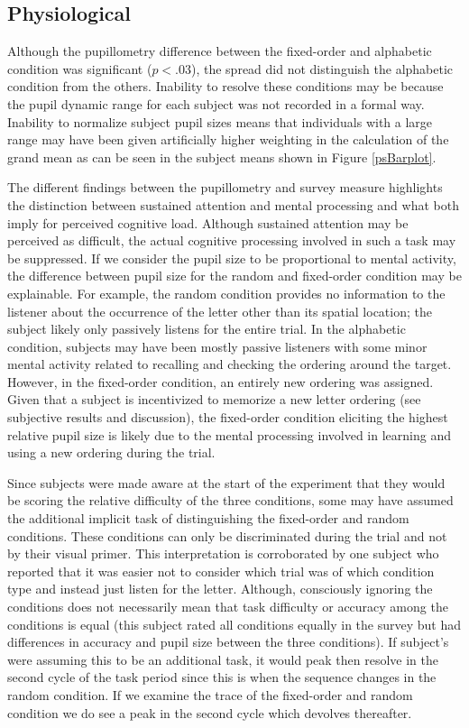 \documentclass[10pt]{article}
\begin{document}
\subsection{Physiological}

Although the pupillometry difference between the fixed-order
and alphabetic condition was significant ($p<.03$), the spread
did not distinguish the alphabetic condition from the others.
Inability to resolve these conditions may be because the pupil
dynamic range for each subject was not recorded in a formal
way. Inability to normalize subject pupil sizes means that
individuals with a large range may have been given
artificially higher weighting in the calculation of the grand
mean as can be seen in the subject means shown in Figure
\ref{psBarplot}.

The different findings between the pupillometry and survey measure
highlights the distinction between sustained attention and
mental processing and what both imply for perceived cognitive
load.  Although sustained attention may be perceived as
difficult, the actual cognitive processing involved in such a
task may be suppressed.
If we consider the pupil size to be proportional to mental
activity, the difference between pupil size for the random and
fixed-order condition may be explainable.  For example, the
random condition provides no information to the listener about
the occurrence of the letter other than its spatial location;
the subject likely only passively listens for the
entire trial.  In the alphabetic condition,
subjects may have been mostly passive listeners with some minor mental activity
related to recalling and checking the ordering around the target.
However, in the fixed-order condition,
an entirely new ordering was assigned. Given that
a subject is incentivized to memorize a new letter ordering
(see subjective results and discussion), the fixed-order
condition eliciting the highest relative pupil size 
is likely due to the mental processing involved
in learning and using a new ordering during the trial.  

Since subjects were made aware at the start of the experiment
that they would be scoring the relative difficulty of the
three conditions, some may have assumed the additional
implicit task of distinguishing the fixed-order and random
conditions. These conditions can only be discriminated during
the trial and not by their visual primer.  This interpretation
is corroborated by one subject who reported that it was easier
not to consider which trial was of which condition type and
instead just listen for the letter.  Although, consciously
ignoring the conditions does not necessarily mean that task
difficulty or accuracy among the conditions is equal (this
subject rated all conditions equally in the survey but had
differences in accuracy and pupil size between the three
conditions).  If subject's were assuming this to be an
additional task, it would peak then resolve in the second
cycle of the task period since this is when the sequence
changes in the random condition.  If we examine the trace of
the fixed-order and random condition we do see a peak in the
second cycle which devolves thereafter.
\end{document}
